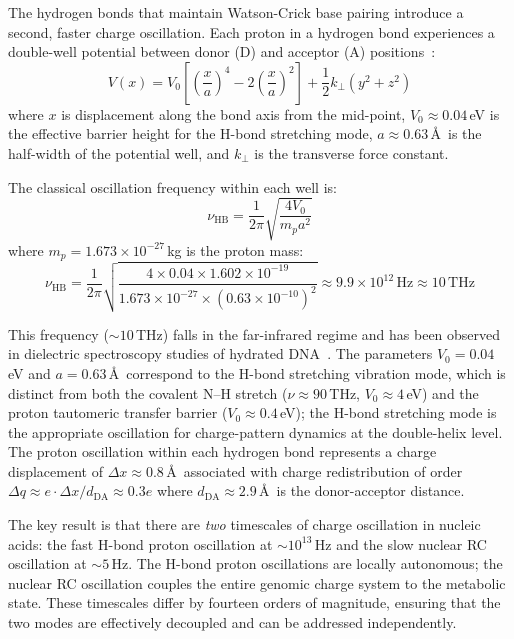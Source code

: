 \documentclass[11pt,twocolumn,a4paper]{article}
\theoremstyle{definition}
\theoremstyle{remark}
\begin{document}
The hydrogen bonds that maintain Watson-Crick base pairing introduce a second, faster charge oscillation. Each proton in a hydrogen bond experiences a double-well potential between donor (D) and acceptor (A) positions~\cite{Lowdin1963,Limbach2006}:
\begin{equation}
  V(x) = V_0 \left[\left(\frac{x}{a}\right)^4 - 2\left(\frac{x}{a}\right)^2\right] + \frac{1}{2}k_\perp(y^2 + z^2)
  \label{eq:double_well}
\end{equation}
where $x$ is displacement along the bond axis from the mid-point, $V_0 \approx 0.04$\,eV is the effective barrier height for the H-bond stretching mode, $a \approx 0.63$\,\AA\ is the half-width of the potential well, and $k_\perp$ is the transverse force constant.

The classical oscillation frequency within each well is:
\begin{equation}
  \nu_{\mathrm{HB}} = \frac{1}{2\pi}\sqrt{\frac{4V_0}{m_p a^2}}
  \label{eq:hbond_freq}
\end{equation}
where $m_p = 1.673 \times 10^{-27}$\,kg is the proton mass:
\begin{equation}
  \nu_{\mathrm{HB}} = \frac{1}{2\pi}\sqrt{\frac{4 \times 0.04 \times 1.602 \times 10^{-19}}{1.673 \times 10^{-27} \times (0.63 \times 10^{-10})^2}} \approx 9.9 \times 10^{12}\,\mathrm{Hz} \approx 10\,\mathrm{THz}
  \label{eq:hbond_freq_numerical}
\end{equation}

This frequency ($\sim\!10$\,THz) falls in the far-infrared regime and has been observed in dielectric spectroscopy studies of hydrated DNA~\cite{Weidlich1990,Woolard2002}. The parameters $V_0 = 0.04$\,eV and $a = 0.63$\,\AA\ correspond to the H-bond stretching vibration mode, which is distinct from both the covalent N--H stretch ($\nu \approx 90$\,THz, $V_0 \approx 4$\,eV) and the proton tautomeric transfer barrier ($V_0 \approx 0.4$\,eV); the H-bond stretching mode is the appropriate oscillation for charge-pattern dynamics at the double-helix level. The proton oscillation within each hydrogen bond represents a charge displacement of $\Delta x \approx 0.8$\,\AA\ associated with charge redistribution of order $\Delta q \approx e \cdot \Delta x / d_{\mathrm{DA}} \approx 0.3e$ where $d_{\mathrm{DA}} \approx 2.9$\,\AA\ is the donor-acceptor distance.

The key result is that there are \emph{two} timescales of charge oscillation in nucleic acids: the fast H-bond proton oscillation at $\sim\!10^{13}$\,Hz and the slow nuclear RC oscillation at $\sim\!5$\,Hz. The H-bond proton oscillations are locally autonomous; the nuclear RC oscillation couples the entire genomic charge system to the metabolic state. These timescales differ by fourteen orders of magnitude, ensuring that the two modes are effectively decoupled and can be addressed independently.
\end{document}
